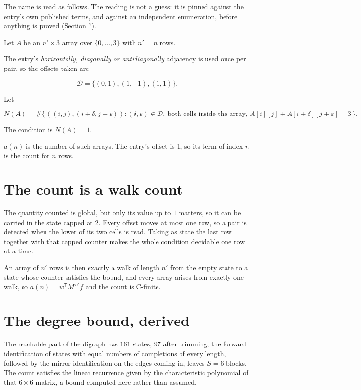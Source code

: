 \documentclass[11pt]{article}
\theoremstyle{definition}
\begin{document}
The name is read as follows. The reading is not a guess: it is pinned against the entry's own published terms, and against an independent enumeration, before anything is proved (Section 7).

Let $A$ be an $n' \times 3$ array over $\{0,\dots,3\}$ with $n' = n$ rows.

The entry's {\itshape horizontally, diagonally or antidiagonally} adjacency is used once per pair, so the offsets taken are

\[\mathcal{D} = \{(0,1), (1,-1), (1,1)\}.\]

Let

\[N(A) = \#\bigl\{\,((i,j),(i{+}\delta,j{+}\varepsilon)) : (\delta,\varepsilon) \in \mathcal{D},\ \text{both cells inside the array},\ A[i][j] + A[i{+}\delta][j{+}\varepsilon] = 3\,\bigr\}.\]

The condition is $N(A) = 1$.

$a(n)$ is the number of such arrays. The entry's offset is 1, so its term of index $n$ is the count for $n$ rows.

\section{The count is a walk count}

The quantity counted is global, but only its value up to $1$ matters, so it can be carried in the state capped at $2$. Every offset moves at most one row, so a pair is detected when the lower of its two cells is read. Taking as state the last row together with that capped counter makes the whole condition decidable one row at a time.

An array of $n'$ rows is then exactly a walk of length $n'$ from the empty state to a state whose counter satisfies the bound, and every array arises from exactly one walk, so $a(n) = w^{\mathsf T}M^{\,n'}f$ and the count is C-finite.

\section{The degree bound, derived}

The reachable part of the digraph has $161$ states, $97$ after trimming; the forward identification of states with equal numbers of completions of every length, followed by the mirror identification on the edges coming in, leaves $S = 6$ blocks. The count satisfies the linear recurrence given by the characteristic polynomial of that $6\times6$ matrix, a bound computed here rather than assumed.
\end{document}
